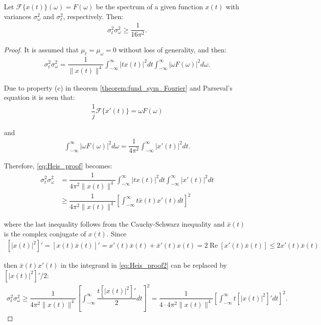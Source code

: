 \begin{theorem}
Let $\mathcal{F}\{x(t)\}(\omega) = F(\omega)$ be the spectrum of a given function $x(t)$ with variances $\sigma_\omega^2$ and $\sigma_t^2$, respectively. Then:
\begin{align*}
\sigma_t^2 \sigma_\omega^2 \geq \dfrac{1}{16 \pi^2}.
\end{align*}
\end{theorem}

\begin{proof}
It is assumed that $\mu_t = \mu_\omega = 0$ without loss of generality, and then:
\begin{align} \label{eq:Heis_proof}
\sigma_t^2 \sigma_\omega^2 = \dfrac{1}{\|x(t)\|^4} \int_{-\infty}^\infty |tx(t)|^2 dt \int_{-\infty}^\infty |\omega F(\omega)|^2 d\omega.
\end{align}

Due to property (c) in theorem \ref{theorem:fund_sym_Fourier} and Parseval's equation it is seen that:
\begin{align*}
\dfrac{1}{j} \mathcal{F}\{x'(t)\} = \omega F(\omega)
\end{align*}

and
\begin{align*}
\int_{-\infty}^\infty |\omega F(\omega)|^2 d\omega = \dfrac{1}{4\pi^2} \int_{-\infty}^\infty |x'(t)|^2 dt.
\end{align*}

Therefore, \eqref{eq:Heis_proof} becomes:
\begin{align} \label{eq:Heis_proof2}
\sigma_t^2 \sigma_\omega^2 &= \dfrac{1}{4\pi^2 \|x(t)\|^4} \int_{-\infty}^\infty |tx(t)|^2 dt \int_{-\infty}^\infty | x'(t)|^2 dt \nonumber \\
&\geq \dfrac{1}{4\pi^2 \|x(t)\|^4} \left[ \int_{-\infty}^\infty t \bar{x}(t)x'(t) dt \right]^2
\end{align}

where the last inequality follows from the Cauchy-Schwarz inequality and $\bar{x}(t)$ is the complex conjugate of $x(t)$. Since
\begin{align*}
\left[ |x(t)|^2 \right]' = \left[ x(t) \bar{x}(t) \right]' = x'(t) \bar{x}(t) + \bar{x}'(t) x(t) = 2 \operatorname{Re} \left[ x'(t) \bar{x}(t) \right] \leq 2 x'(t) \bar{x}(t)
\end{align*}

then $\bar{x}(t) x'(t)$ in the integrand in \eqref{eq:Heis_proof2} can be replaced by $\left[ |x(t)|^2 \right]'/2$:
\begin{align} \label{eq:Heis_proof3}
\sigma_t^2 \sigma_\omega^2 \geq \dfrac{1}{4\pi^2 \|x(t)\|^4} \left[ \int_{-\infty}^\infty \dfrac{t \left[ |x(t)|^2 \right]'}{2} dt \right]^2 = \dfrac{1}{4 \cdot 4\pi^2 \|x(t)\|^4} \left[ \int_{-\infty}^\infty t \left[ |x(t)|^2 \right]' dt \right]^2.
\end{align}


\end{proof}
